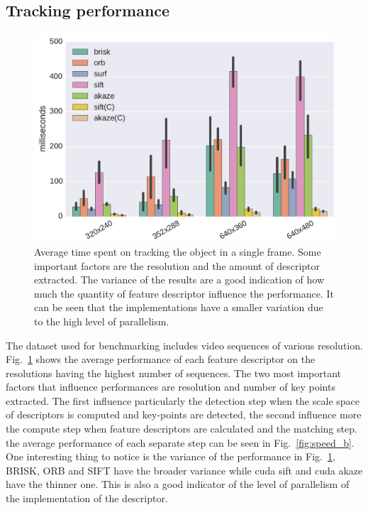 \subsection{Tracking performance}

\begin{figure}[b]
	\includegraphics[width=0.95\linewidth]{imgs/tracker_fps_std.pdf}
\vspace{-2.5mm}	
\caption{Average time spent on tracking the object in a single frame. Some important factors are the resolution and the amount of descriptor extracted. The variance of the results are a good indication of how much the quantity of feature descriptor influence the performance. It can be seen that the implementations have a smaller variation due to the high level of parallelism. }
\label{fig:speed}
\end{figure}

The dataset used for benchmarking includes video sequences of various resolution. Fig.~\ref{fig:speed} shows the average performance of each feature descriptor on the resolutions having the highest number of sequences. The two most important factors that influence performances are resolution and number of key points extracted. The first influence particularly the detection step when the scale space of descriptors is computed and key-points are detected, the second influence more the compute step when feature descriptors are calculated and the matching step. the average performance of each separate step can be seen in Fig.~\ref{fig:speed_b}. One interesting thing to notice is the variance of the performance in Fig.~\ref{fig:speed}, BRISK, ORB and SIFT have the broader variance while cuda sift and cuda akaze have the thinner one. This is also a good indicator of the level of parallelism of the implementation of the descriptor.  


